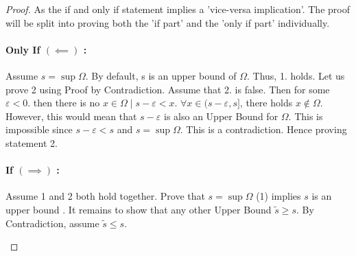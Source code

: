 \documentclass[a4paper, notitlepage]{report}
\theoremstyle{remark}
\theoremstyle{definition}
\begin{document}
            
            
            \begin{proof}
                As the if and only if statement implies a 'vice-versa implication'. The proof will be split into proving both the 'if part' and the 'only if part' individually.
		\paragraph{Only If \( (\impliedby) \) :}
                Assume $s = \sup \Omega$. By default, s is an upper bound of $\Omega$. Thus, 1. holds.
                Let us prove 2 using Proof by Contradiction. Assume that 2. is false. Then for some $\varepsilon < 0$. then there is no $x \in \Omega \mid s - \varepsilon < x$. $\forall x \in (s-\varepsilon , s]$, there holds $x \notin \Omega$.
                However, this would mean that $s-\varepsilon$ is also an Upper Bound for $\Omega$. This is impossible since $s-\varepsilon < s$ and $s = \sup \Omega$. This is a contradiction. Hence proving statement 2.

		\paragraph{If \( (\implies) \) :}
                Assume 1 and 2  both hold together. Prove that $s = \sup
		\Omega$ (1) implies \( s \) is an upper bound . It remains to
		show that any other Upper Bound $\tilde{s} \geq s$.
                By Contradiction, assume $\tilde{s} \leq s$. 
                
\begin{center} 
\tikzset{
    pattern size/.store in=\mcSize, 
    pattern size = 5pt,
    pattern thickness/.store in=\mcThickness, 
    pattern thickness = 0.3pt,
    pattern radius/.store in=\mcRadius, 
    pattern radius = 1pt}
    \makeatletter
    \makeatother
    
    \begin{tikzpicture}[x=0.75pt,y=0.75pt,yscale=-1,xscale=1]
    

\end{tikzpicture}
\end{center}
\end{proof}
\end{document}
